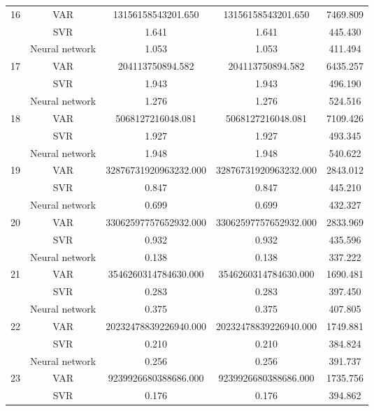 \documentclass[12pt]{article}
\begin{document}
\begin{longtable}{|p{2cm}|c|c|c|c|}
\hline
\multirow{3}{*}{16} &VAR &   13156158543201.650 &    13156158543201.650 &    7469.809\\
\cline{2-5}
 &SVR &   1.641 &    1.641 &    445.430\\
\cline{2-5}
 &Neural network &   1.053 &    1.053 &    411.494\\
\cline{2-5}
\hline
\multirow{3}{*}{17} &VAR &   204113750894.582 &    204113750894.582 &    6435.257\\
\cline{2-5}
 &SVR &   1.943 &    1.943 &    496.190\\
\cline{2-5}
 &Neural network &   1.276 &    1.276 &    524.516\\
\cline{2-5}
\hline
\multirow{3}{*}{18} &VAR &   5068127216048.081 &    5068127216048.081 &    7109.426\\
\cline{2-5}
 &SVR &   1.927 &    1.927 &    493.345\\
\cline{2-5}
 &Neural network &   1.948 &    1.948 &    540.622\\
\cline{2-5}
\hline
\multirow{3}{*}{19} &VAR &   32876731920963232.000 &    32876731920963232.000 &    2843.012\\
\cline{2-5}
 &SVR &   0.847 &    0.847 &    445.210\\
\cline{2-5}
 &Neural network &   0.699 &    0.699 &    432.327\\
\cline{2-5}
\hline
\multirow{3}{*}{20} &VAR &   33062597757652932.000 &    33062597757652932.000 &    2833.969\\
\cline{2-5}
 &SVR &   0.932 &    0.932 &    435.596\\
\cline{2-5}
 &Neural network &   0.138 &    0.138 &    337.222\\
\cline{2-5}
\hline
\multirow{3}{*}{21} &VAR &   3546260314784630.000 &    3546260314784630.000 &    1690.481\\
\cline{2-5}
 &SVR &   0.283 &    0.283 &    397.450\\
\cline{2-5}
 &Neural network &   0.375 &    0.375 &    407.805\\
\cline{2-5}
\hline
\multirow{3}{*}{22} &VAR &   20232478839226940.000 &    20232478839226940.000 &    1749.881\\
\cline{2-5}
 &SVR &   0.210 &    0.210 &    384.824\\
\cline{2-5}
 &Neural network &   0.256 &    0.256 &    391.737\\
\cline{2-5}
\hline
\multirow{3}{*}{23} &VAR &   9239926680388686.000 &    9239926680388686.000 &    1735.756\\
\cline{2-5}
 &SVR &   0.176 &    0.176 &    394.862\\

\end{longtable}
\end{document}
